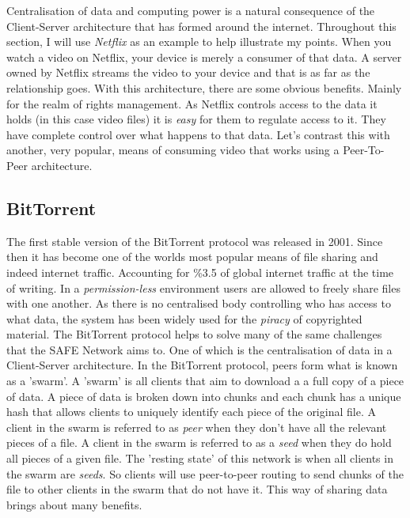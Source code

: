 Centralisation of data and computing power is a natural consequence of the Client-Server architecture that has formed around the internet. Throughout this section, I will use \textit{Netflix}\cite{netflix} as an example to help illustrate my points. When you watch a video on Netflix, your device is merely a consumer of that data. A server owned by Netflix streams the video to your device and that is as far as the relationship goes. With this architecture, there are some obvious benefits. Mainly for the realm of rights management. As Netflix controls access to the data it holds (in this case video files) it is \textit{easy} for them to regulate access to it. They have complete control over what happens to that data. Let's contrast this with another, very popular, means of consuming video that works using a Peer-To-Peer architecture.

\subsection{BitTorrent}

The first stable version of the BitTorrent protocol was released in 2001. Since then it has become one of the worlds most popular means of file sharing and indeed internet traffic. Accounting for \%3.5 of global internet traffic at the time of writing\cite{bittorrent-usage}. In a \textit{permission-less} environment users are allowed to freely share files with one another. As there is no centralised body controlling who has access to what data, the system has been widely used for the \textit{piracy} of copyrighted material. The BitTorrent protocol helps to solve many of the same challenges that the SAFE Network aims to. One of which is the centralisation of data in a Client-Server architecture. In the BitTorrent protocol, peers form what is known as a 'swarm'. A 'swarm' is all clients that aim to download a a full copy of a piece of data. A piece of data is broken down into chunks and each chunk has a unique hash that allows clients to uniquely identify each piece of the original file. A client in the swarm is referred to as \textit{peer} when they don't have all the relevant pieces of a file. A client in the swarm is referred to as a \textit{seed} when they do hold all pieces of a given file. The 'resting state' of this network is when all clients in the swarm are \textit{seeds}. So clients will use peer-to-peer routing to send chunks of the file to other clients in the swarm that do not have it. This way of sharing data brings about many benefits. 

